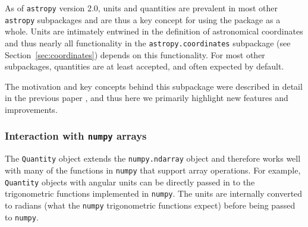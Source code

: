 \documentclass[modern]{aastex61}
\newcommand{\package}[1]{\texttt{#1}\xspace}
\newcommand{\astropypkg}{\package{astropy}}
\newcommand{\sectionname}{Section\xspace}
\newcommand{\inlinecomment}[2]{\todo[inline]{#1: #2}\xspace}
\begin{document}

As of \astropypkg version 2.0, units and quantities are prevalent in most other
\astropypkg subpackages and are thus a key concept for using the package as a
whole.
Units are intimately entwined in the definition of astronomical coordinates and
thus nearly all functionality in the \texttt{astropy.coordinates} subpackage
(see \sectionname~\ref{sec:coordinates}) depends on this functionality.
For most other subpackages, quantities are at least accepted, and often expected
by default.

The motivation and key concepts behind this subpackage were described in detail
in the previous paper \citep{astropy}, and thus here we primarily highlight new
features and improvements.

\subsubsection{Interaction with \package{numpy} arrays}

The \texttt{Quantity} object extends
the \texttt{numpy.ndarray} object and therefore
works well with many of the functions in \texttt{numpy} that support
array operations. For example, \texttt{Quantity} objects with angular
units can be directly passed in to the trigonometric functions implemented in
\texttt{numpy}. The units are internally converted to radians (what the \texttt{numpy}
trigonometric functions expect) before being passed to \texttt{numpy}.

\end{document}
